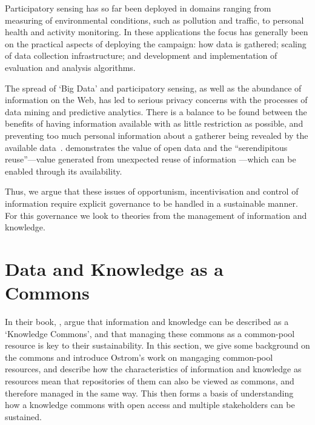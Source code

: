 Participatory sensing has so far been deployed in domains ranging from
measuring of environmental conditions, such as pollution and traffic, to
personal health and activity monitoring. In these applications the focus has
generally been on the practical aspects of deploying the campaign: how data is
gathered; scaling of data collection infrastructure; and development and
implementation of evaluation and analysis algorithms. 


The spread of `Big Data' and participatory sensing, as well as the abundance
of information on the Web, has led to serious privacy concerns with the
processes of data mining and predictive analytics. There is a balance to be
found between the benefits of having information available with as little
restriction as possible, and preventing too much personal information about a
gatherer being revealed by the available data~\citep{ohara2010}.
\citet{Shadbolt2012} demonstrates the value of open data and the
``serendipitous reuse''---value generated from unexpected reuse of information
---which can be enabled through its availability.


Thus, we argue that these issues of opportunism, incentivisation and control
of information require explicit governance to be handled in a sustainable
manner. For this governance we look to theories from the management of
information and knowledge. %

\section{Data and Knowledge as a Commons}\label{sec:commons}

In their book, \citet{Hess2007}, argue that information and knowledge can be
described as a `Knowledge Commons', and that managing these commons as a
common-pool resource is key to their sustainability. In this section, we give
some background on the commons and introduce Ostrom's work on mangaging
common-pool resources, and describe how the characteristics of information and
knowledge as resources mean that repositories of them can also be viewed as
commons, and therefore managed in the same way. This then forms a basis of
understanding how a knowledge commons with open access and multiple
stakeholders can be sustained. %

